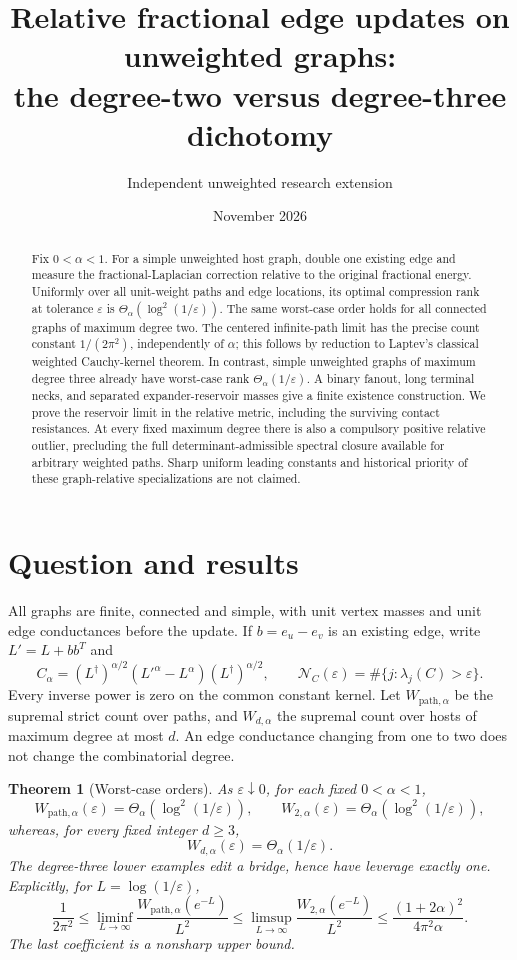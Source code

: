 \documentclass[11pt]{article}
\title{Relative fractional edge updates on unweighted graphs:\\
the degree-two versus degree-three dichotomy}
\author{Independent unweighted research extension}
\date{November 2026}
\newtheorem{theorem}{Theorem}[section]
\newcommand{\N}{\mathcal N}
\begin{document}
\maketitle
\begin{abstract}
Fix $0<\alpha<1$. For a simple unweighted host graph, double one existing
edge and measure the fractional-Laplacian correction relative to the
original fractional energy. Uniformly over all unit-weight paths and
edge locations, its optimal compression rank at tolerance $\varepsilon$
is $\Theta_\alpha(\log^2(1/\varepsilon))$. The same worst-case order holds
for all connected graphs of maximum degree two. The centered infinite-path
limit has the precise count constant $1/(2\pi^2)$, independently of
$\alpha$; this follows by reduction to Laptev's classical weighted
Cauchy-kernel theorem. In contrast, simple unweighted graphs of maximum
degree three already have worst-case rank
$\Theta_\alpha(1/\varepsilon)$. A binary fanout, long terminal necks,
and separated expander-reservoir masses give a finite existence
construction. We prove the reservoir limit in the relative metric,
including the surviving contact resistances. At every fixed maximum
degree there is also a compulsory positive relative outlier, precluding
the full determinant-admissible spectral closure available for arbitrary
weighted paths. Sharp uniform leading constants and historical priority
of these graph-relative specializations are not claimed.
\end{abstract}

\section{Question and results}
All graphs are finite, connected and simple, with unit vertex masses
and unit edge conductances before the update. If $b=e_u-e_v$ is an
existing edge, write $L'=L+bb^T$ and
\[
 C_\alpha=(L^\dagger)^{\alpha/2}(L'^\alpha-L^\alpha)
                                      (L^\dagger)^{\alpha/2},\qquad
 \N_C(\varepsilon)=\#\{j:\lambda_j(C)>\varepsilon\}.
\]
Every inverse power is zero on the common constant kernel. Let
$W_{\mathrm{path},\alpha}$ be the supremal strict count over paths,
and $W_{d,\alpha}$ the supremal count over hosts of maximum degree at
most $d$. An edge conductance changing from one to two does not change
the combinatorial degree.

\begin{theorem}[Worst-case orders]\label{thm:main}
As $\varepsilon\downarrow0$, for each fixed $0<\alpha<1$,
\[
 W_{\mathrm{path},\alpha}(\varepsilon)
   =\Theta_\alpha(\log^2(1/\varepsilon)),\qquad
 W_{2,\alpha}(\varepsilon)
   =\Theta_\alpha(\log^2(1/\varepsilon)),
\]
whereas, for every fixed integer $d\ge3$,
\[
 W_{d,\alpha}(\varepsilon)=\Theta_\alpha(1/\varepsilon).
\]
The degree-three lower examples edit a bridge, hence have leverage
exactly one. Explicitly, for $L=\log(1/\varepsilon)$,
\[
 \frac1{2\pi^2}
 \le\liminf_{L\to\infty}\frac{W_{\mathrm{path},\alpha}(e^{-L})}{L^2}
 \le\limsup_{L\to\infty}\frac{W_{2,\alpha}(e^{-L})}{L^2}
 \le\frac{(1+2\alpha)^2}{4\pi^2\alpha}.
\]
The last coefficient is a nonsharp upper bound.
\end{theorem}
\end{document}
